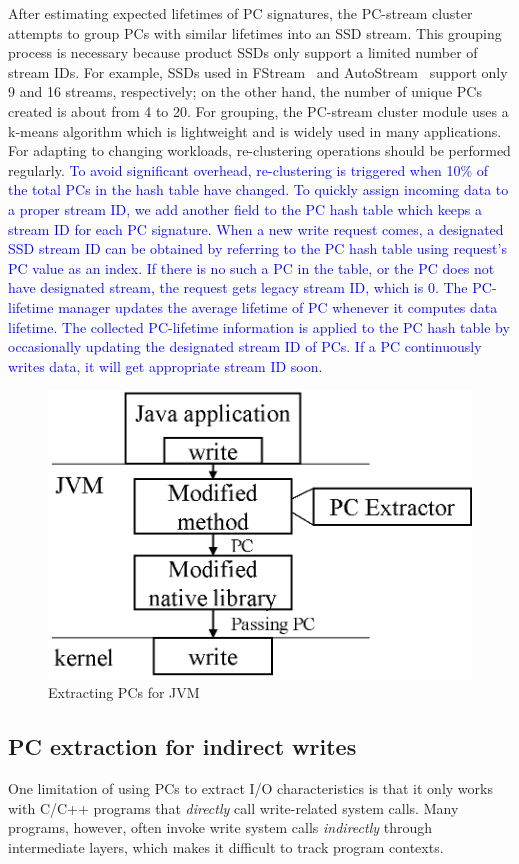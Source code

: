 After estimating expected lifetimes of PC signatures, the \textsf{PC-stream
cluster} attempts to group PCs with similar lifetimes into an SSD stream.  This
grouping process is necessary because product SSDs only support a limited
number of stream IDs. For example, SSDs used in \textsf{\small
FStream}~\cite{FStream} and \textsf{\small AutoStream}~\cite{AutoStream}
support only 9 and 16 streams, respectively; on the other hand, the number of
unique PCs created is about from 4 to 20.  For grouping, the PC-stream
cluster module uses a k-means algorithm which is lightweight and is widely used
in many applications. For adapting to changing workloads, re-clustering
operations should be performed regularly. \textcolor{blue}{To avoid significant
overhead, re-clustering is triggered when 10\% of the total PCs in the hash
table have changed}.
\textcolor{blue}{To quickly assign incoming data to a proper stream ID, we add
another field to the PC hash table which keeps a stream ID for each PC
signature.  
}
\textcolor{blue}{
When a new write request comes, a designated SSD stream ID can be
obtained by referring to the PC hash table using request's PC value as an
index.
If there is no such a PC in the table, or the PC does not have designated stream,
the request gets legacy stream ID, which is 0.
The PC-lifetime manager updates the average lifetime of PC whenever it computes
data lifetime.
The collected PC-lifetime information is applied to the PC hash table
by occasionally updating the designated stream ID of PCs.
If a PC continuously writes data, it will get appropriate stream ID soon.
}



\begin{figure}[t]
\centering
	\includegraphics[width=0.6\linewidth]{figure/jvmpc}
\caption{Extracting PCs for JVM}
\label{fig:java}
\end{figure}


\subsection{PC extraction for indirect writes}
One limitation of using PCs to extract I/O characteristics is that it only
works with C/C++ programs that \textit{directly} call write-related system
calls.  Many programs, however, often invoke write system calls
\textit{indirectly} through intermediate layers, which makes it difficult to
track program contexts.

